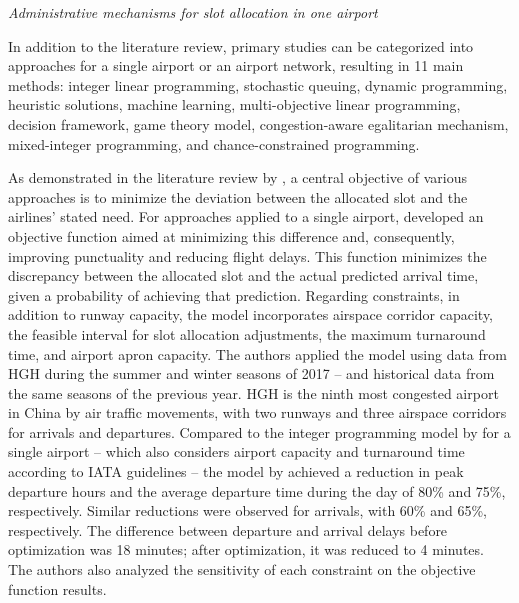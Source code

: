\hfill \break
\textit{Administrative mechanisms for slot allocation in one airport}
\hfill \break

In addition to the literature review, primary studies can be categorized into approaches for a single airport or an airport network, resulting in 11 main methods: integer linear programming, stochastic queuing, dynamic programming, heuristic solutions, machine learning, multi-objective linear programming, decision framework, game theory model, congestion-aware egalitarian mechanism, mixed-integer programming, and chance-constrained programming.

As demonstrated in the literature review by , a central objective of various approaches is to minimize the deviation between the allocated slot and the airlines' stated need. For approaches applied to a single airport,  developed an objective function aimed at minimizing this difference and, consequently, improving punctuality and reducing flight delays. This function minimizes the discrepancy between the allocated slot and the actual predicted arrival time, given a probability of achieving that prediction. Regarding constraints, in addition to runway capacity, the model incorporates airspace corridor capacity, the feasible interval for slot allocation adjustments, the maximum turnaround time, and airport apron capacity. The authors applied the model using data from \acrfull{HGH} during the summer and winter seasons of 2017 – and historical data from the same seasons of the previous year. \acrshort{HGH} is the ninth most congested airport in China by air traffic movements, with two runways and three airspace corridors for arrivals and departures. Compared to the integer programming model by  for a single airport – which also considers airport capacity and turnaround time according to IATA guidelines – the model by  achieved a reduction in peak departure hours and the average departure time during the day of 80\% and 75\%, respectively. Similar reductions were observed for arrivals, with 60\% and 65\%, respectively. The difference between departure and arrival delays before optimization was 18 minutes; after optimization, it was reduced to 4 minutes. The authors also analyzed the sensitivity of each constraint on the objective function results.

